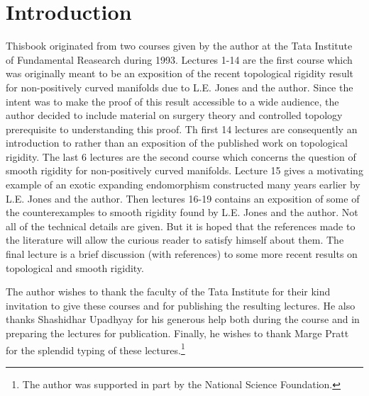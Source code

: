 



\chapter{Introduction}

This\pageoriginale book originated from two courses given by the author at the Tata
Institute of Fundamental Reasearch during 1993. Lectures 1-14 are the
first course which was originally meant to be an exposition of the
recent topological rigidity result for non-positively curved manifolds
due to L.E. Jones and the author. Since the intent was to make the
proof of this result accessible to a wide audience, the author decided
to include material on surgery theory and controlled topology
prerequisite to understanding this proof. Th first 14 lectures are
consequently an introduction to rather than an exposition of the
published work on topological rigidity. The last 6 lectures are the
second course which concerns the question of smooth rigidity for
non-positively curved manifolds. Lecture 15 gives a motivating example
of an exotic expanding endomorphism constructed many years earlier by
L.E. Jones and the author. Then lectures 16-19 contains an exposition
of some of the counterexamples to smooth rigidity found by L.E. Jones
and the author. Not all of the technical details are given. But it is
hoped that the references made to the literature will allow the
curious reader to satisfy himself about them. The final lecture is a
brief discussion (with references) to some more recent results on
topological and smooth rigidity.

The author wishes to thank the faculty of the Tata Institute for their
kind invitation to give these courses and for publishing the resulting
lectures. He also thanks Shashidhar Upadhyay for his generous help
both during the course and in preparing the lectures for
publication. Finally, he wishes to thank Marge Pratt for the splendid
typing of these lectures.\footnote{The author was supported in part by the National Science Foundation.}
